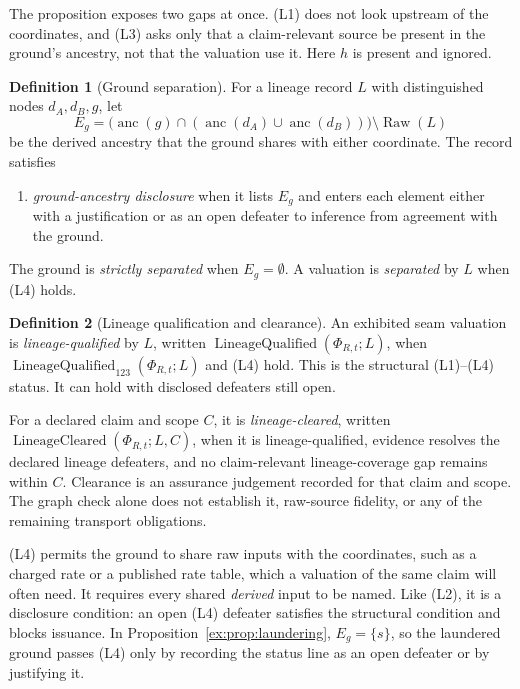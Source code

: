 \documentclass[11pt]{article}
\theoremstyle{definition}
\newtheorem{definition}{Definition}[section]
\begin{document}
The proposition exposes two gaps at once. (L1) does not look upstream of the coordinates, and (L3) asks only that a claim-relevant source be present in the ground's ancestry, not that the valuation use it. Here $h$ is present and ignored.

\begin{definition}[Ground separation]\label{ex:def:separation}
For a lineage record $L$ with distinguished nodes $d_A,d_B,g$, let
\[
E_g=\bigl(\operatorname{anc}(g)\cap(\operatorname{anc}(d_A)\cup\operatorname{anc}(d_B))\bigr)\setminus\operatorname{Raw}(L)
\]
be the derived ancestry that the ground shares with either coordinate. The record satisfies
\begin{enumerate}
\item[(L4)] \emph{ground-ancestry disclosure} when it lists $E_g$ and enters each element either with a justification or as an open defeater to inference from agreement with the ground.
\end{enumerate}
The ground is \emph{strictly separated} when $E_g=\emptyset$. A valuation is \emph{separated} by $L$ when (L4) holds.
\end{definition}

\begin{definition}[Lineage qualification and clearance]\label{ex:def:lineage-qualified}
An exhibited seam valuation is \emph{lineage-qualified} by $L$, written $\operatorname{LineageQualified}(\Phi_{R,t};L)$, when $\operatorname{LineageQualified}_{123}(\Phi_{R,t};L)$ and (L4) hold. This is the structural (L1)--(L4) status. It can hold with disclosed defeaters still open.

For a declared claim and scope $C$, it is \emph{lineage-cleared}, written $\operatorname{LineageCleared}(\Phi_{R,t};L,C)$, when it is lineage-qualified, evidence resolves the declared lineage defeaters, and no claim-relevant lineage-coverage gap remains within $C$. Clearance is an assurance judgement recorded for that claim and scope. The graph check alone does not establish it, raw-source fidelity, or any of the remaining transport obligations.
\end{definition}

(L4) permits the ground to share raw inputs with the coordinates, such as a charged rate or a published rate table, which a valuation of the same claim will often need. It requires every shared \emph{derived} input to be named. Like (L2), it is a disclosure condition: an open (L4) defeater satisfies the structural condition and blocks issuance. In Proposition~\ref{ex:prop:laundering}, $E_g=\{s\}$, so the laundered ground passes (L4) only by recording the status line as an open defeater or by justifying it.
\end{document}
